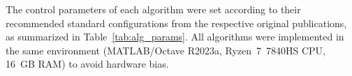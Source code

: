 \documentclass[a4paper,12pt]{article}
\begin{document}
The control parameters of each algorithm were set according to their recommended standard configurations from the respective original publications, as summarized in Table~\ref{tab:alg_params}. All algorithms were implemented in the same environment (MATLAB/Octave R2023a, Ryzen~7~7840HS CPU, 16~GB RAM) to avoid hardware bias.

\end{document}

